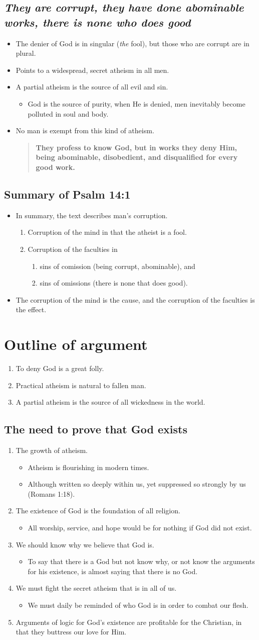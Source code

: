 \documentclass{article}
\newcommand{\BE}{\begin{enumerate}\item}
\newcommand{\EE}{\end{enumerate}}
\newcommand{\BI}{\begin{itemize}\item}
\newcommand{\EI}{\end{itemize}}
\newcommand{\I}{\item}
\newcommand{\Q}[2]{\begin{quote} \textbf{#2 \center{#1}}\end{quote}}
\begin{document}
\subsection{\emph{They are corrupt, they have done abominable works,
            there is none who does good}}
\BI The denier of God is in singular (\emph{the} fool),
    but those who are corrupt are in plural.
\I  Points to a widespread, secret atheism in all men.
\I  A partial atheism is the source of all evil and sin.
    \BI God is the source of purity, when He is denied,
        men inevitably become polluted in soul and body. \EI
\I  No man is exempt from this kind of atheism.
    \Q{Titus 1:16}
    {They profess to know God, but in works they deny Him,
    being abominable, disobedient, and disqualified for 
    every good work.} \EI

\subsection{Summary of Psalm 14:1}
\BI In summary, the text describes man's corruption.
\BE Corruption of the mind in that the atheist is a fool.
\I  Corruption of the faculties in 
    \BE sins of comission (being corrupt, abominable), and
    \I  sins of omissions (there is none that does good). \EE 
\EE
\I  The corruption of the mind is the cause, and 
    the corruption of the faculties is the effect. \EI

\section{Outline of argument}
\BE To deny God is a great folly.
\I  Practical atheism is natural to fallen man.
\I  A partial atheism  is the source of all wickedness 
    in the world.  \EE

\subsection{The need to prove that God exists}
\BE The growth of atheism.
    \BI Atheism is flourishing in modern times.
    \I  Although written so deeply within us,
        yet suppressed so strongly by us (Romans 1:18). \EI
\I  The existence of God is the foundation of all religion.
    \BI All worship, service, and hope would be for nothing
        if God did not exist. \EI
\I  We should know why we believe that God is.
    \BI To say that there is a God but not know why,
        or not know the arguments for his existence,
        is almost saying that there is no God. \EI
\I  We must fight the secret atheism that is in all of us.
    \BI We must daily be reminded of who God is
        in order to combat our flesh. \EI
\I  Arguments of logic for God's existence are profitable 
    for the Christian, in that they buttress our love for Him. \EE
\end{document}
